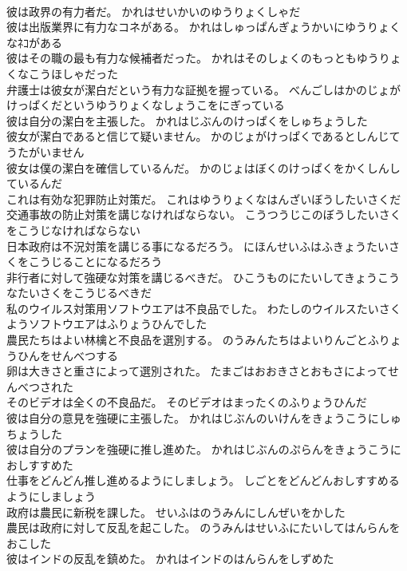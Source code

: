 \documentclass[8pt]{extreport}
\begin{document}
\begin{CJK}{UTF8}{min}
\\	彼は政界の有力者だ。	かれはせいかいのゆうりょくしゃだ 
\\	彼は出版業界に有力なコネがある。	かれはしゅっぱんぎょうかいにゆうりょくなﾈｺがある 
\\	彼はその職の最も有力な候補者だった。	かれはそのしょくのもっともゆうりょくなこうほしゃだった 
\\	弁護士は彼女が潔白だという有力な証拠を握っている。	べんごしはかのじょがけっぱくだというゆうりょくなしょうこをにぎっている 
\\	彼は自分の潔白を主張した。	かれはじぶんのけっぱくをしゅちょうした 
\\	彼女が潔白であると信じて疑いません。	かのじょがけっぱくであるとしんじてうたがいません 
\\	彼女は僕の潔白を確信しているんだ。	かのじょはぼくのけっぱくをかくしんしているんだ 
\\	これは有効な犯罪防止対策だ。	これはゆうりょくなはんざいぼうしたいさくだ 
\\	交通事故の防止対策を講じなければならない。	こうつうじこのぼうしたいさくをこうじなければならない 
\\	日本政府は不況対策を講じる事になるだろう。	にほんせいふはふきょうたいさくをこうじることになるだろう 
\\	非行者に対して強硬な対策を講じるべきだ。	ひこうものにたいしてきょうこうなたいさくをこうじるべきだ 
\\	私のウイルス対策用ソフトウエアは不良品でした。	わたしのウイルスたいさくようソフトウエアはふりょうひんでした 
\\	農民たちはよい林檎と不良品を選別する。	のうみんたちはよいりんごとふりょうひんをせんべつする 
\\	卵は大きさと重さによって選別された。	たまごはおおきさとおもさによってせんべつされた 
\\	そのビデオは全くの不良品だ。	そのビデオはまったくのふりょうひんだ 
\\	彼は自分の意見を強硬に主張した。	かれはじぶんのいけんをきょうこうにしゅちょうした 
\\	彼は自分のプランを強硬に推し進めた。	かれはじぶんのぷらんをきょうこうにおしすすめた 
\\	仕事をどんどん推し進めるようにしましょう。	しごとをどんどんおしすすめるようにしましょう 
\\	政府は農民に新税を課した。	せいふはのうみんにしんぜいをかした 
\\	農民は政府に対して反乱を起こした。	のうみんはせいふにたいしてはんらんをおこした 
\\	彼はインドの反乱を鎮めた。	かれはインドのはんらんをしずめた 

\end{CJK}
\end{document}

